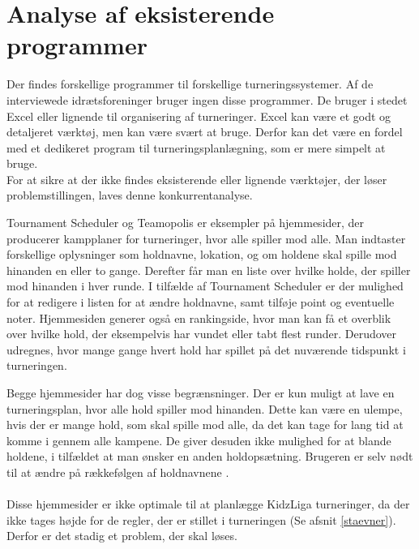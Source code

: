\section{Analyse af eksisterende programmer}
Der findes forskellige programmer til forskellige turneringssystemer. Af de interviewede idrætsforeninger bruger ingen disse programmer. De bruger i stedet Excel eller lignende til organisering af turneringer. Excel kan være et godt og detaljeret værktøj, men kan være svært at bruge. Derfor kan det være en fordel med et dedikeret program til turneringsplanlægning, som er mere simpelt at bruge.\\
For at sikre at der ikke findes eksisterende eller lignende værktøjer, der løser problemstillingen, laves denne konkurrentanalyse.
\par
Tournament Scheduler og Teamopolis er eksempler på hjemmesider, der producerer kampplaner for turneringer, hvor alle spiller mod alle. Man indtaster forskellige oplysninger som holdnavne, lokation, og om holdene skal spille mod hinanden en eller to gange. Derefter får man en liste over hvilke holde, der spiller mod hinanden i hver runde. I tilfælde af Tournament Scheduler er der mulighed for at redigere i listen for at ændre holdnavne, samt tilføje point og eventuelle noter. Hjemmesiden generer også en rankingside, hvor man kan få et overblik over hvilke hold, der eksempelvis har vundet eller tabt flest runder. Derudover udregnes, hvor mange gange hvert hold har spillet på det nuværende tidspunkt i turneringen.
\par
Begge hjemmesider har dog visse begrænsninger. Der er kun muligt at lave en turneringsplan, hvor alle hold spiller mod hinanden. Dette kan være en ulempe, hvis der er mange hold, som skal spille mod alle, da det kan tage for lang tid at komme i gennem alle kampene. De giver desuden ikke mulighed for at blande holdene, i tilfældet at man ønsker en anden holdopsætning. Brugeren er selv nødt til at ændre på rækkefølgen af holdnavnene \citep{Teamopolis}\citep{TournamentScheduler}.
\\\\
Disse hjemmesider er ikke optimale til at planlægge KidzLiga turneringer, da der ikke tages højde for de regler, der er stillet i turneringen (Se afsnit \ref{staevner}). Derfor er det stadig et problem, der skal løses. 
